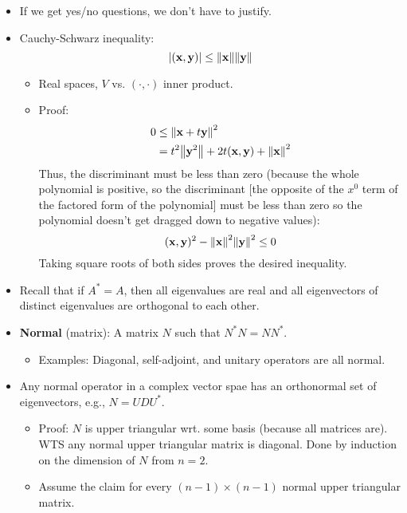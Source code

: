 \documentclass[../../notes.tex]{subfiles}
\begin{document}
\begin{itemize}
\begin{itemize}
    \end{itemize}
    \item {}If we get yes/no questions, we don't have to justify.
    \item Cauchy-Schwarz inequality:
    \begin{equation*}
        |(\mathbf{x},\mathbf{y})| \leq \norm{\mathbf{x}}\norm{\mathbf{y}}
    \end{equation*}
    \begin{itemize}
        \item Real spaces, $V$ vs. $(\cdot,\cdot)$ inner product.
        \item Proof:
        \begin{align*}
            0 &\leq \norm{\mathbf{x}+t\mathbf{y}}^2\\
            &= t^2\norm{\mathbf{y}^2}+2t(\mathbf{x},\mathbf{y})+\norm{\mathbf{x}}^2
        \end{align*}
        Thus, the discriminant must be less than zero (because the whole polynomial is positive, so the discriminant [the opposite of the $x^0$ term of the factored form of the polynomial] must be less than zero so the polynomial doesn't get dragged down to negative values):
        \begin{equation*}
            (\mathbf{x},\mathbf{y})^2-\norm{\mathbf{x}}^2\norm{\mathbf{y}}^2 \leq 0
        \end{equation*}
        Taking square roots of both sides proves the desired inequality.
    \end{itemize}
    \item Recall that if $A^*=A$, then all eigenvalues are real and all eigenvectors of distinct eigenvalues are orthogonal to each other.
    \item \textbf{Normal} (matrix): A matrix $N$ such that $N^*N=NN^*$.
    \begin{itemize}
        \item Examples: Diagonal, self-adjoint, and unitary operators are all normal.
    \end{itemize}
    \item Any normal operator in a complex vector spae has an orthonormal set of eigenvectors, e.g., $N=UDU^*$.
    \begin{itemize}
        \item Proof: $N$ is upper triangular wrt. some basis (because all matrices are). WTS any normal upper triangular matrix is diagonal. Done by induction on the dimension of $N$ from $n=2$.
        \item Assume the claim for every $(n-1)\times(n-1)$ normal upper triangular matrix.

\end{itemize}
\end{itemize}
\end{document}
